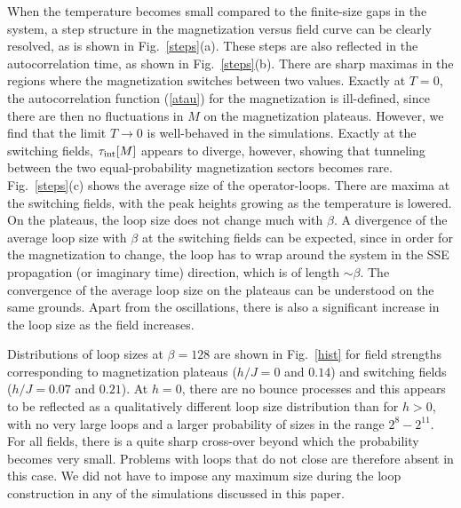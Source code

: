 \documentclass[10pt,pre,aps,twocolumn,showpacs,superscriptaddress,
floatfix]{revtex4}
\begin{document}
When the temperature becomes small compared to the finite-size gaps in
the system, a step structure in the magnetization versus field curve
can be clearly resolved, as is shown in Fig.~\ref{steps}(a). These steps are
also reflected in the autocorrelation time, as shown in Fig.~\ref{steps}(b). 
There are sharp maximas in the regions where the magnetization switches between
two values. Exactly at $T=0$, the autocorrelation function (\ref{atau}) for 
the magnetization is ill-defined, since there are then no fluctuations in
$M$ on the magnetization plateaus. However, we find that the limit $T\to 0$ is
well-behaved in the simulations. Exactly at the switching fields, 
$\tau_{\rm int}[M]$ appears to diverge, however, showing that tunneling 
between the two equal-probability magnetization sectors becomes 
rare. Fig.~\ref{steps}(c) shows the average size of the operator-loops. 
There are maxima at the switching fields, with the peak heights growing as
the temperature is lowered. On the plateaus, the loop size does not change
much with $\beta$. A divergence of the average loop size with $\beta$ at the 
switching fields can be expected, since in order for the magnetization to 
change, the loop has to wrap around the system in the SSE propagation (or 
imaginary time) direction, which is of length $\sim \beta$. The convergence 
of the average loop size on the plateaus can be understood on the same 
grounds. Apart from the oscillations, there is also a significant increase 
in the loop size as the field increases.

Distributions of loop sizes at $\beta=128$ are shown in Fig.~\ref{hist} for
field strengths corresponding to magnetization plateaus ($h/J=0$ and $0.14$) 
and switching fields ($h/J=0.07$ and $0.21$). At $h=0$, there are no bounce 
processes and this appears to be reflected as a qualitatively different loop 
size distribution than for $h > 0$, with no very large loops and a larger 
probability of sizes in the range $2^8 - 2^{11}$. For all fields, there
is a quite sharp cross-over beyond which the probability becomes very small. 
Problems with loops that do not close \cite{pinaki,dorneich2} are therefore 
absent in this case. We did not have to impose any maximum size during the
loop construction in any of the simulations discussed in this paper.
\end{document}
